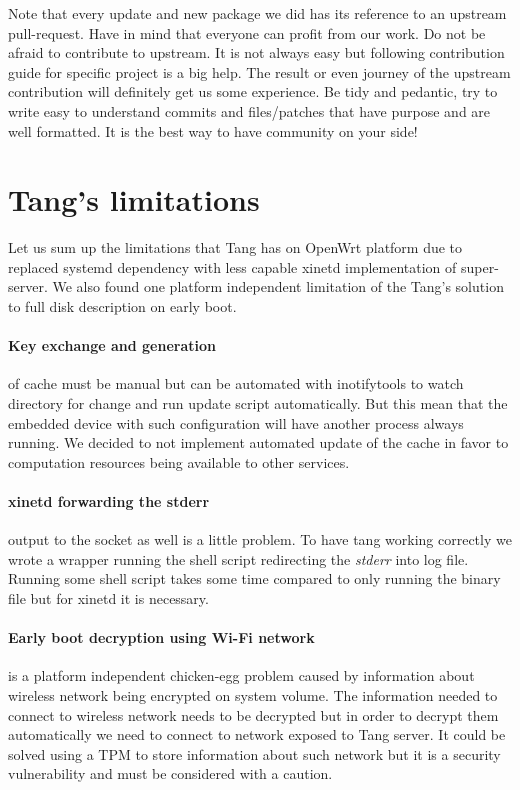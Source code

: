 Note that every update and new package we did has its reference to an upstream pull-request.
Have in mind that everyone can profit from our work.
Do not be afraid to contribute to upstream.
It is not always easy but following contribution guide for specific project is a big help.
The result or even journey of the upstream contribution will definitely get us some experience.
Be tidy and pedantic, try to write easy to understand commits and files/patches that have purpose and are well formatted.
It is the best way to have community on your side!




\section{Tang's limitations}\label{limitations}

Let us sum up the limitations that Tang has on OpenWrt platform due to replaced systemd dependency with less capable xinetd implementation of super-server.
We also found one platform independent limitation of the Tang's solution to full disk description on early boot.

\paragraph{Key exchange and generation} of cache must be manual but  can be automated with inotifytools to watch directory for change and run update script automatically.
But this mean that the embedded device with such configuration will have another process always running.
We decided to not implement automated update of the cache in favor to computation resources being available to other services.

\paragraph{xinetd forwarding the stderr} output to the socket as well is a little problem.
To have tang working correctly we wrote a wrapper running the shell script redirecting the {\it stderr} into log file.
Running some shell script takes some time compared to only running the binary file but for xinetd it is necessary.

\paragraph{Early boot decryption using Wi-Fi network} is a platform independent chicken-egg problem caused by information about wireless network being encrypted on system volume.
The information needed to connect to wireless network needs to be decrypted but in order to decrypt them automatically we need to connect to network exposed to Tang server.
It could be solved using a TPM to store information about such network but it is a security vulnerability and must be considered with a caution.
